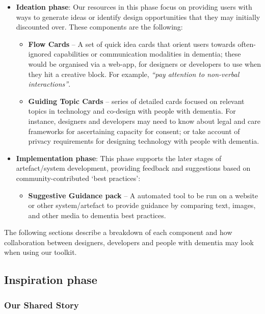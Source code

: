\begin{itemize}
    \item \textbf{Ideation phase}: Our resources in this phase focus on providing users with ways to generate ideas or identify design opportunities that they may initially discounted over. These components are the following:
    \begin{itemize}
        \item \textbf{Flow Cards} – A set of quick idea cards that orient users towards often-ignored capabilities or communication modalities in dementia; these would be organised via a web-app, for designers or developers to use when they hit a creative block. For example, \textit{``pay attention to non-verbal interactions''}.
        \item \textbf{Guiding Topic Cards} – series of detailed cards focused on relevant topics in technology and co-design with people with dementia. For instance, designers and developers may need to know about legal and care frameworks for ascertaining capacity for consent; or take account of privacy requirements for designing technology with people with dementia.
    \end{itemize}
\end{itemize}

\begin{itemize}
    \item \textbf{Implementation phase}: This phase supports the later stages of artefact/system development, providing feedback and suggestions based on community-contributed `best practices': 
    \begin{itemize}
        \item \textbf{Suggestive Guidance pack} – A automated tool to be run on a website or other system/artefact to provide guidance by comparing text, images, and other media to dementia best practices. 
    \end{itemize}
\end{itemize}

The following sections describe a breakdown of each component and how collaboration between designers, developers and people with dementia may look when using our toolkit. 

\subsection{Inspiration phase}
\subsubsection{Our Shared Story}

